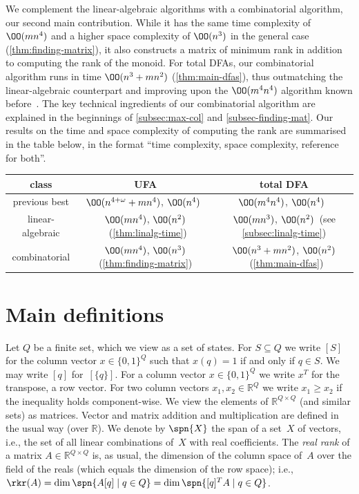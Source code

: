 We complement the linear-algebraic algorithms with a combinatorial algorithm, our second main contribution. While it has the same time complexity of  $\OO(mn^4)$ and a higher space complexity of $\OO(n^3)$ in the general case (\autoref{thm:finding-matrix}), it also constructs a matrix of minimum rank in addition to computing the rank of the monoid. For total DFAs, our combinatorial algorithm runs in time $\OO(n^3 + mn^2)$ (\autoref{thm:main-dfas}), thus outmatching the linear-algebraic counterpart and improving upon the $\OO(m^4n^4)$ algorithm known before~\cite{Rystsov1992Rank}. The key technical ingredients of our combinatorial algorithm are explained in the beginnings of \autoref{subsec:max-col} and \autoref{subsec-finding-mat}.
Our results on the time and space complexity of computing the rank are summarised in the table below, in the format ``time complexity, space complexity, reference for both''.

\begin{center}
\begin{tabular}{ccc}
  \toprule
  class & UFA & total DFA \\
  \midrule
  previous best & $\OO(n^{4 + \omega} + mn^4)$, $\OO(n^4)$~\cite{Carpi1988} & $\OO(m^4n^4)$, $\OO(n^4)$~\cite{Rystsov1992Rank} \\
  linear-algebraic & $\OO(mn^4)$,  $\OO(n^2)$~(\autoref{thm:linalg-time}) & $\OO(mn^3)$, $\OO(n^2)$~(see \autoref{subsec:linalg-time}) \\
  combinatorial & $\OO( mn^4)$, $\OO(n^3)$ (\autoref{thm:finding-matrix}) & $\OO(n^3 + mn^2)$, $\OO(n^2)$~(\autoref{thm:main-dfas}) \\
  \bottomrule
\end{tabular}
\end{center}

\section{Main definitions}\label{sec-definitions}
Let $Q$ be a finite set, which we view as a set of states.
For $S \subseteq Q$ we write $[S]$ for the column vector $x \in \{0,1\}^Q$ such that $x(q) = 1$ if and only if $q \in S$.
We may write $[q]$ for~$[\{q\}]$.
For a column vector $x \in \{0,1\}^Q$ we write $x^T$ for the transpose, a row vector.
For two column vectors $x_1,x_2 \in \mathbb{R}^Q$ we write $x_1 \ge x_2$ if the inequality holds component-wise.
We view the elements of $\mathbb{R}^{Q \times Q}$ (and similar sets) as matrices.
Vector and matrix addition and multiplication are defined in the usual way (over $\mathbb{R}$).
We denote by $\spn{X}$ the span of a set~$X$ of vectors, i.e., the set of all linear combinations of~$X$ with real coefficients.
The \emph{real rank} of a matrix $A \in \mathbb{R}^{Q \times Q}$ is, as usual, the dimension of the column space of~$A$ over the field of the reals (which equals the dimension of the row space); i.e., $\rkr(A) = \dim \spn{A [q] \mid q \in Q} = \dim \spn{[q]^T A \mid q \in Q}$.

